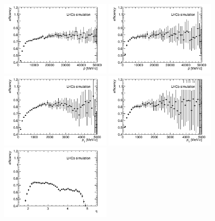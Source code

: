 \begin{figure}[tbph]
\begin{center}
\includegraphics[width = 0.49\textwidth]{figures/EffPatLLT/overall/DstD0piP_TBTC.png} 
\includegraphics[width =0.49\textwidth]{figures/EffPatLLT/overall/DstD0piFromBDP_TBTC.png}
\includegraphics[width = 0.49\textwidth]{figures/EffPatLLT/overall/DstD0piPt_TBTC.png} 
\includegraphics[width =0.49\textwidth]{figures/EffPatLLT/overall/DstD0piFromBDPt_TBTC.png}
\includegraphics[width = 0.49\textwidth]{figures/EffPatLLT/overall/DstD0piEta_TBTC.png} 

\end{center}
\end{figure}
